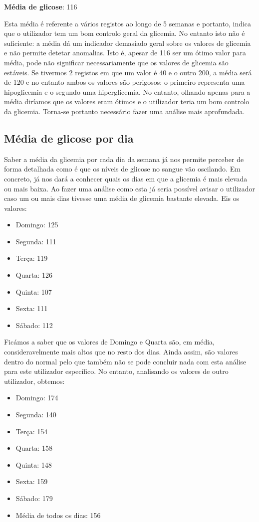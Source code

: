 \textbf{Média de glicose}: 116

Esta média é referente a vários registos ao longo de 5 semanas e portanto, indica que o utilizador tem um bom controlo geral da glicemia. No entanto isto não é suficiente: a média dá um indicador demasiado geral sobre os valores de glicemia e não permite detetar anomalias. Isto é, apesar de 116 ser um ótimo valor para média, pode não significar necessariamente que os valores de glicemia são estáveis. Se tivermos 2 registos em que um valor é 40 e o outro 200, a média será de 120 e no entanto ambos os valores são perigosos: o primeiro representa uma hipoglicemia e o segundo uma hiperglicemia. No entanto, olhando apenas para a média diríamos que os valores eram ótimos e o utilizador teria um bom controlo da glicemia. Torna-se portanto necessário fazer uma análise mais aprofundada.

\subsection{Média de glicose por dia}

Saber a média da glicemia por cada dia da semana já nos permite perceber de forma detalhada como é que os níveis de glicose no sangue vão oscilando. Em concreto, já nos dará a conhecer quais os dias em que a glicemia é mais elevada ou mais baixa. Ao fazer uma análise como esta já seria possível avisar o utilizador caso um ou mais dias tivesse uma média de glicemia bastante elevada. Eis os valores:

\begin{itemize}
\item Domingo: 125
\item Segunda: 111
\item Terça: 119
\item Quarta: 126
\item Quinta: 107
\item Sexta: 111
\item Sábado: 112
\end{itemize}

Ficámos a saber que os valores de Domingo e Quarta são, em média, consideravelmente mais altos que no resto dos dias. Ainda assim, são valores dentro do normal pelo que também não se pode concluir nada com esta análise para este utilizador específico. No entanto, analisando os valores de outro utilizador, obtemos:

\begin{itemize}
\item Domingo: 174
\item Segunda: 140
\item Terça: 154
\item Quarta: 158
\item Quinta: 148
\item Sexta: 159
\item Sábado: 179
\item Média de todos os dias: 156
\end{itemize}


